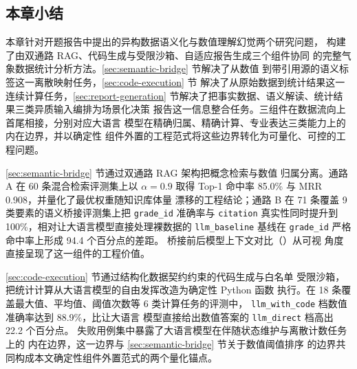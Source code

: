 
\subsection{本章小结}
\label{sec:chap4-summary}

本章针对开题报告中提出的异构数据语义化与数值理解幻觉两个研究问题，
构建了由双通路 RAG、代码生成与受限沙箱、自适应报告生成三个组件协同
的完整气象数据统计分析方法。\ref{sec:semantic-bridge} 节解决了从数值
到带引用源的语义标签这一离散映射任务，\ref{sec:code-execution} 节
解决了从原始数据到统计结果这一连续计算任务，\ref{sec:report-generation}
节解决了把事实数据、语义解读、统计结果三类异质输入编排为场景化决策
报告这一信息整合任务。三组件在数据流向上首尾相接，分别对应大语言
模型在精确归属、精确计算、专业表达三类能力上的内在边界，并以确定性
组件外置的工程范式将这些边界转化为可量化、可控的工程问题。

\ref{sec:semantic-bridge} 节通过双通路 RAG 架构把概念检索与数值
归属分离。通路 A 在 60 条混合检索评测集上以 $\alpha = 0.9$ 取得
Top-1 命中率 85.0\% 与 MRR 0.908，并量化了最优权重随知识库体量
漂移的工程结论；通路 B 在 71 条覆盖 9 类要素的语义桥接评测集上把
\texttt{grade\_\bk{}id} 准确率与 \texttt{citation} 真实性同时提升到
100\%，相对让大语言模型直接处理裸数据的 \texttt{llm\_\bk{}baseline}
基线在 \texttt{grade\_\bk{}id} 严格命中率上形成 94.4 个百分点的差距。
桥接前后模型上下文对比（）从可视
角度直接呈现了这一组件的工程价值。

\ref{sec:code-execution} 节通过结构化数据契约约束的代码生成与白名单
受限沙箱，把统计计算从大语言模型的自由发挥改造为确定性 Python 函数
执行。在 18 条覆盖最大值、平均值、阈值次数等 6 类计算任务的评测中，
\texttt{llm\_\bk{}with\_\bk{}code} 档数值准确率达到 88.9\%，比让大语言
模型直接给出数值答案的 \texttt{llm\_\bk{}direct} 档高出 22.2 个百分点。
失败用例集中暴露了大语言模型在伴随状态维护与离散计数任务上的
内在边界，这一边界与 \ref{sec:semantic-bridge} 节关于数值阈值排序
的边界共同构成本文确定性组件外置范式的两个量化锚点。

